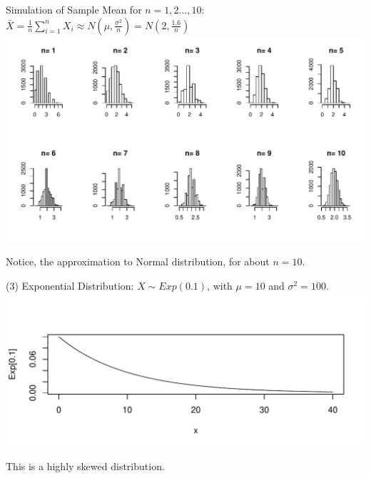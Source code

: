 \documentclass[t,xcolor=pdftex,dvipsnames,table]{beamer}
\makeatletter
\def\maxwidth{ %
  \ifdim\Gin@nat@width>\linewidth
    \linewidth
  \else
    \Gin@nat@width
  \fi
}
\newenvironment{knitrout}{}{} %
\makeatother
\begin{document}
\begin{frame}{}

Simulation of Sample Mean for $n=1,2\ldots,10$: $\bar{X} = \frac{1}{n} \sum_{i=1}^{n} X_{i}  \approx N(\mu, \frac{\sigma^2}{n}) = N(2,\frac{1.6}{n})$  \\

\begin{knitrout}
\color{fgcolor}
\includegraphics[width=\maxwidth]{figure/unnamed-chunk-7-1} 

\end{knitrout}

Notice, the approximation to Normal distribution, for about $n=10$.
\end{frame}



\begin{frame}{}

(3) Exponential Distribution: $X \sim Exp(0.1)$, with $\mu=10$ and $\sigma^2=100$.  \\

\begin{knitrout}
\color{fgcolor}
\includegraphics[width=\maxwidth]{figure/unnamed-chunk-8-1} 

\end{knitrout}

This is a highly skewed distribution.
\end{frame}
\end{document}
